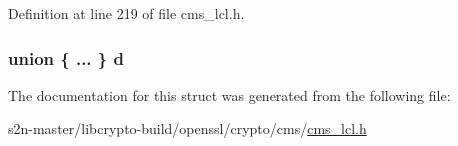 Definition at line 219 of file cms\+\_\+lcl.\+h.

\subsubsection[{\texorpdfstring{d}{d}}]{\setlength{\rightskip}{0pt plus 5cm}union \{ ... \}   d}\hypertarget{struct_c_m_s___originator_identifier_or_key__st_ac650b36037587c3dcbd282ad93f3f694}{}\label{struct_c_m_s___originator_identifier_or_key__st_ac650b36037587c3dcbd282ad93f3f694}


The documentation for this struct was generated from the following file\+:\begin{DoxyCompactItemize}
\item 
s2n-\/master/libcrypto-\/build/openssl/crypto/cms/\hyperlink{cms__lcl_8h}{cms\+\_\+lcl.\+h}\end{DoxyCompactItemize}
